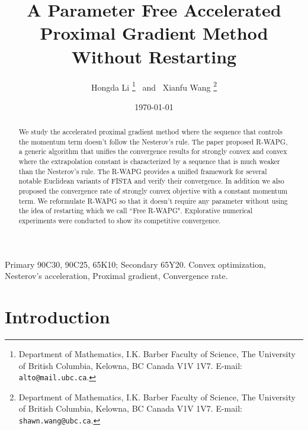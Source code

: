 \documentclass[12pt]{article}
\begin{document}
\title{{\selectfont 
        A Parameter Free Accelerated Proximal Gradient Method Without Restarting
    }}

\author{
    Hongda Li
    \thanks{Department of Mathematics, I.K. Barber Faculty of Science,
    The University of British Columbia, Kelowna, BC Canada V1V 1V7. E-mail:  \texttt{alto@mail.ubc.ca}.}~ and ~Xianfu Wang
    \thanks{Department of Mathematics, I.K. Barber Faculty of Science,
    The University of British Columbia, Kelowna, BC Canada V1V 1V7. E-mail:  \texttt{shawn.wang@ubc.ca}.}
}

\date{\today}

\maketitle


\begin{abstract} 
    \noindent
    We study the accelerated proximal gradient method where the sequence that controls the momentum term doesn't follow the Nesterov's rule. 
    The paper proposed R-WAPG, a generic algorithm that unifies the convergence results for strongly convex and convex where the extrapolation constant is characterized by a sequence that is much weaker than the Nesterov's rule. 
    The R-WAPG provides a unified framework for several notable Euclidean variants of FISTA and verify their convergence. 
    In addition we also proposed the convergence rate of strongly convex objective with a constant momentum term. 
    We reformulate R-WAPG so that it doesn't require any parameter without using the idea of restarting which we call ``Free R-WAPG". 
    Explorative numerical experiments were conducted to show its competitive convergence. 
\end{abstract}

Primary 90C30, 90C25, 65K10; Secondary 65Y20. 
 Convex optimization, Nesterov's acceleration, Proximal gradient, Convergence rate. 

\section{Introduction}
\end{document}
